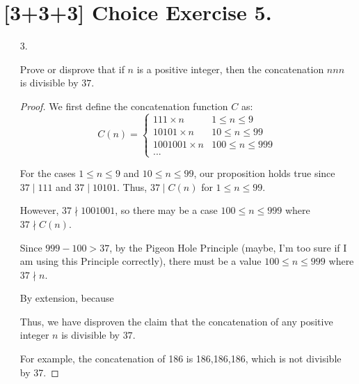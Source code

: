 \documentclass{article}
\begin{document}
\section*{[3+3+3] Choice Exercise 5.}

\begin{enumerate}
    \item[3.] {
        Prove or disprove that if \(n\) is a positive integer, then the concatenation 
        \(nnn\) is divisible by \(37\). 

        \begin{proof}
            We first define the concatenation function \(C\) as: 
            \[C(n) = \begin{cases}
                111 \times n & 1 \le n \le 9 \\
                10101 \times n & 10 \le n \le 99 \\
                1001001 \times n & 100 \le n \le 999 \\
                ...

            \end{cases}\]

            For the cases \(1 \le n \le 9\) and \(10 \le n \le 99\), our proposition 
            holds true since \(37 \mid 111\) and \(37 \mid 10101\). Thus, \(37 \mid C(n)\)
            for \(1 \le n \le 99\).

            However, \(37 \nmid 1001001\), so there may be a case \(100 \le n \le 999\) 
            where \(37 \nmid C(n)\). 

            Since \(999 - 100 > 37\), by the Pigeon Hole Principle (maybe, I'm 
            too sure if I am using this Principle correctly), there must be a 
            value \(100 \le n \le 999\) where \(37 \nmid n\). 

            By extension, because 

            Thus, we have disproven the claim that the concatenation of any positive
            integer \(n\) is divisible by \(37\). 

            For example, the concatenation of 186 is 186,186,186, which is not 
            divisible by 37.
        \end{proof}
    }
\end{enumerate}
\end{document}
